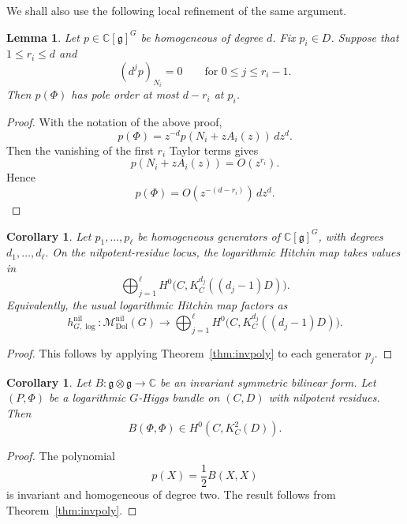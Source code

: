 \documentclass[10pt,a4paper]{amsart}
\numberwithin{equation}{section}
\newtheorem{lemma}[theorem]{Lemma}
\newtheorem{corollary}[theorem]{Corollary}
\begin{document}
We shall also use the following local refinement of the same argument.

\begin{lemma}
\label{lem:refined-pole}
Let \(p\in\mathbb C[\mathfrak g]^G\) be homogeneous of degree \(d\). Fix
\(p_i\in D\). Suppose that \(1\leq r_i\leq d\) and 
\[
        (d^j p)_{N_i}=0
        \qquad
        \text{for }0\leq j\leq r_i-1.
\]
Then \(p(\Phi)\) has pole order at most \(d-r_i\) at \(p_i\).
\end{lemma}

\begin{proof}
With the notation of the above proof,
\[
        p(\Phi)
        =
        z^{-d}p(N_i+zA_i(z))\,dz^d.
\]
Then the vanishing of the first \(r_i\) Taylor terms gives
\[
        p(N_i+zA_i(z))=O(z^{r_i}).
\]
Hence
\[
        p(\Phi)=O(z^{-(d-r_i)})\,dz^d.
\]
\end{proof}


\begin{corollary}
\label{cor:nilpotent-hitchin-map}
Let
\(
        p_1,\ldots,p_\ell
\)
be homogeneous generators of \(\mathbb C[\mathfrak g]^G\), with degrees
\(
        d_1,\ldots,d_\ell.
\)
On the nilpotent-residue locus, the logarithmic Hitchin map takes values in
\[
        \bigoplus_{j=1}^{\ell}
        H^0\bigl(C,K_C^{d_j}((d_j-1)D)\bigr).
\]
Equivalently, the usual logarithmic Hitchin map factors as
\[
        h_{G,\log}^{\mathrm{nil}}:
        \mathcal M_{\mathrm{Dol}}^{\mathrm{nil}}(G)
        \longrightarrow
        \bigoplus_{j=1}^{\ell}
        H^0\bigl(C,K_C^{d_j}((d_j-1)D)\bigr).
\]
\end{corollary}


\begin{proof}
This follows by applying Theorem~\ref{thm:invpoly} to each generator
\(p_j\).
\end{proof}




\begin{corollary}
\label{cor:quadratic}
Let
\(
        B:\mathfrak g\otimes\mathfrak g\longrightarrow\mathbb C
\)
be an invariant symmetric bilinear form.  Let \((P,\Phi)\) be a logarithmic
\(G\)-Higgs bundle on \((C,D)\) with nilpotent residues. Then
\[
        B(\Phi,\Phi)\in H^0(C,K_C^2(D)).
\]
\end{corollary}

\begin{proof}
The polynomial
\[
        p(X)=\frac12 B(X,X)
\]
is invariant and homogeneous of degree two.  The result follows from
Theorem~\ref{thm:invpoly}.
\end{proof}
\end{document}
